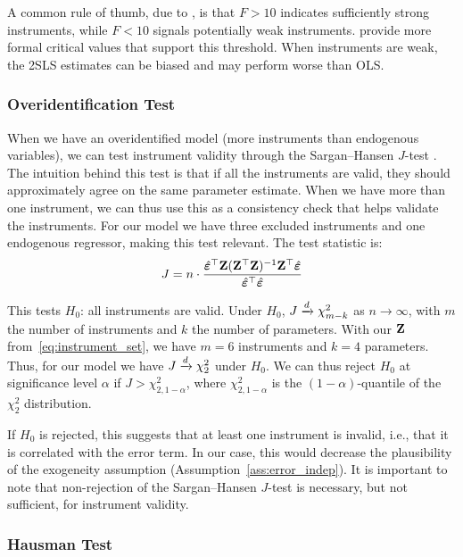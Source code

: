 A common rule of thumb, due to \textcite[p.~557]{Staiger1997}, is that $F > 10$ indicates sufficiently strong instruments, while $F < 10$ signals potentially weak instruments. \textcite[Table~1]{StockYogo2005} provide more formal critical values that support this threshold. When instruments are weak, the 2SLS estimates can be biased and may perform worse than OLS\@.

\subsubsection{Overidentification Test}

When we have an overidentified model (more instruments than endogenous variables), we can test instrument validity through the Sargan--Hansen $J$-test \parencite{Sargan1958, Hansen1982}. The intuition behind this test is that if all the instruments are valid, they should approximately agree on the same parameter estimate. When we have more than one instrument, we can thus use this as a consistency check that helps validate the instruments. For our model we have three excluded instruments and one endogenous regressor, making this test relevant. The test statistic is:
\begin{equation}
    J = n \cdot \frac{\hat{\bm{\varepsilon}}^\top\mathbf{Z}(\mathbf{Z}^\top\mathbf{Z})^{-1} \mathbf{Z}^\top\hat{\bm{\varepsilon}}}{\hat{\bm{\varepsilon}}^\top\hat{\bm{\varepsilon}}}
\end{equation}

This tests $H_0$: all instruments are valid. Under $H_0$, $J \xrightarrow{d} \chi^2_{m-k}$ as $n \to \infty$, with $m$ the number of instruments and $k$ the number of parameters. With our $\mathbf{Z}$ from~\eqref{eq:instrument_set}, we have $m = 6$ instruments and $k = 4$ parameters. Thus, for our model we have $J \xrightarrow{d} \chi^2_2$ under $H_0$. We can thus reject $H_0$ at significance level $\alpha$ if $J > \chi^2_{2,1-\alpha}$, where $\chi^2_{2,1-\alpha}$ is the $(1-\alpha)$-quantile of the $\chi^2_2$ distribution.

If $H_0$ is rejected, this suggests that at least one instrument is invalid, i.e., that it is correlated with the error term. In our case, this would decrease the plausibility of the exogeneity assumption (Assumption~\ref{ass:error_indep}). It is important to note that non-rejection of the Sargan--Hansen $J$-test is necessary, but not sufficient, for instrument validity.

\subsubsection{Hausman Test}

